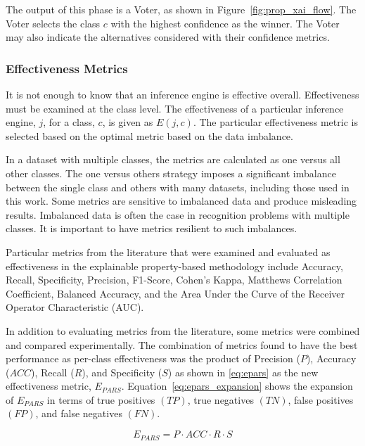 The output of this phase is a Voter, as shown in Figure~\ref{fig:prop_xai_flow}.
The Voter selects the class $c$ with the highest confidence as the winner. The
Voter may also indicate the alternatives considered with their confidence
metrics.

\subsubsection{Effectiveness Metrics}
\label{effectiveness_metrics}

It is not enough to know that an inference engine is effective overall.
Effectiveness must be examined at the class level. The effectiveness of a
particular inference engine, $j$, for a class, $c$, is given as $E(j,c)$. The
particular effectiveness metric is selected based on the optimal metric based on
the data imbalance.

In a dataset with multiple classes, the metrics are calculated as one versus all
other classes. The one versus others strategy imposes a significant imbalance
between the single class and others with many datasets, including those used in
this work. Some metrics are sensitive to imbalanced data and produce misleading
results. Imbalanced data is often the case in recognition problems with multiple
classes. It is important to have metrics resilient to such imbalances.

Particular metrics from the literature that were examined and evaluated as
effectiveness in the explainable property-based methodology include Accuracy,
Recall, Specificity, Precision, F1-Score, Cohen's Kappa, Matthews Correlation
Coefficient, Balanced Accuracy, and the Area Under the Curve of the Receiver
Operator Characteristic (AUC).

In addition to evaluating metrics from the literature, some metrics were
combined and compared experimentally. The combination of metrics found to have
the best performance as per-class effectiveness was the product of Precision
($P$), Accuracy ($ACC$), Recall ($R$), and Specificity ($S$) as shown in
\eqref{eq:epars} as the new effectiveness metric, $E_{PARS}$.
Equation~\eqref{eq:epars_expansion} shows the expansion of $E_{PARS}$ in terms
of  true positives $(TP)$, true negatives $(TN)$, false positives $(FP)$, and
false negatives $(FN)$\cite{whitten24icmi}.

\begin{equation}\label{eq:epars}
    E_{PARS} = P \cdot ACC \cdot R \cdot S
\end{equation}


